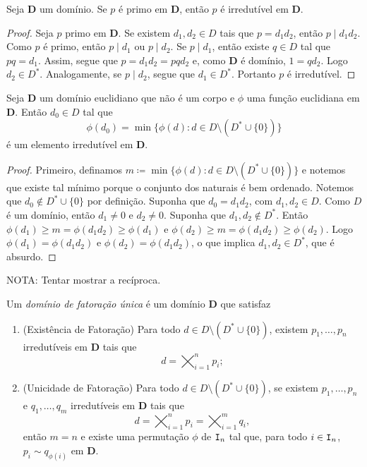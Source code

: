 \begin{prop}
	Seja $\bm D$ um domínio. Se $p$ é primo em $\bm D$, então $p$ é irredutível em $\bm D$.
\end{prop}
\begin{proof}
	Seja $p$ primo em $\bm D$. Se existem $d_1,d_2 \in D$ tais que $p=d_1d_2$, então $p \mid d_1d_2$. Como $p$ é primo, então $p \mid d_1$ ou $p \mid d_2$. Se $p \mid d_1$, então existe $q \in D$ tal que $pq=d_1$. Assim, segue que $p=d_1d_2=pqd_2$ e, como $\bm D$ é domínio, $1=qd_2$. Logo $d_2 \in D^*$. Analogamente, se $p \mid d_2$, segue que $d_1 \in D^*$. Portanto $p$ é irredutível.
\end{proof}

\begin{prop}
	Seja $\bm D$ um domínio euclidiano que não é um corpo e $\phi$ uma função euclidiana em $\bm D$. Então $d_0 \in D$ tal que
	\begin{equation*}
	\phi(d_0) = \min\{\phi(d) : d \in D \setminus (D^* \cup \{0\}) \}
	\end{equation*}
é um elemento irredutível em $\bm D$.
\end{prop}
\begin{proof}
	Primeiro, definamos $m \coloneqq \min\{\phi(d) : d \in D \setminus (D^* \cup \{0\}) \}$ e notemos que existe tal mínimo porque o conjunto dos naturais é bem ordenado. Notemos que $d_0 \notin D^* \cup \{0\}$ por definição. Suponha que $d_0 = d_1d_2$, com $d_1,d_2 \in D$. Como $D$ é um domínio, então $d_1 \neq 0$ e $d_2 \neq 0$. Suponha que $d_1,d_2 \notin D^*$. Então $\phi(d_1) \geq m = \phi(d_1d_2) \geq \phi(d_1)$ e $\phi(d_2) \geq m = \phi(d_1d_2) \geq \phi(d_2)$. Logo $\phi(d_1)=\phi(d_1d_2)$ e $\phi(d_2)=\phi(d_1d_2)$, o que implica $d_1,d_2 \in D^*$, que é absurdo.
\end{proof}

NOTA: Tentar mostrar a recíproca.

\begin{defi}
	Um \emph{domínio de fatoração única} é um domínio $\bm D$ que satisfaz
	\begin{enumerate}
	\item (Existência de Fatoração) Para todo $d \in D \setminus (D^* \cup \{0\})$, existem $p_1, \ldots, p_n$ irredutíveis em $\bm D$ tais que
	\begin{equation*}
	d = \bigtimes_{i=1}^n p_i;
	\end{equation*}
	\item (Unicidade de Fatoração) Para todo $d \in D \setminus (D^* \cup \{0\})$, se existem $p_1, \ldots, p_n$ e $q_1, \ldots, q_m$ irredutíveis em $\bm D$ tais que
	\begin{equation*}
	d = \bigtimes_{i=1}^n p_i = \bigtimes_{i=1}^m q_i,
	\end{equation*}
então $m=n$ e existe uma permutação $\phi$ de $\mathtt I_n$ tal que, para todo $i \in \mathtt I_n$, $p_i \sim q_{\phi(i)}$ em $\bm D$.
	\end{enumerate}
\end{defi}

